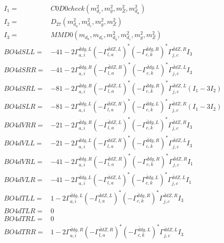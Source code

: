 \documentclass[A4,landscape]{article}
\begin{document}
\begin{align} 
I_1 = & C0D0check(m^2_{d_{{c}}}, m^2_{g}, m^2_{Z}, m^2_{d_{{a}}}) \\ 
I_2 = & D_{27}(m^2_{d_{{a}}}, m^2_{d_{{c}}}, m^2_{g}, m^2_{Z}) \\ 
I_3 = & MMD0(m_{d_{{a}}}, m_{d_{{c}}}, m^2_{d_{{a}}}, m^2_{d_{{c}}}, m^2_{g}, m^2_{Z}) \\ 
  BO4dSLL= & -4 1
-
2 \Gamma^{\bar{d}d g ,L}_{a, i} (- \Gamma^{\bar{d}d Z ,L} _{l, a})^* (- \Gamma^{\bar{d}d g ,R} _{c, k})^* \Gamma^{\bar{d}d Z ,R}_{j, c} I_3 \\ 
  BO4dSRR= & -4 1
-
2 \Gamma^{\bar{d}d g ,R}_{a, i} (- \Gamma^{\bar{d}d Z ,R} _{l, a})^* (- \Gamma^{\bar{d}d g ,L} _{c, k})^* \Gamma^{\bar{d}d Z ,L}_{j, c} I_3 \\ 
  BO4dSRL= & -8 1
-
2 \Gamma^{\bar{d}d g ,R}_{a, i} (- \Gamma^{\bar{d}d Z ,L} _{l, a})^* (- \Gamma^{\bar{d}d g ,R} _{c, k})^* \Gamma^{\bar{d}d Z ,L}_{j, c} (I_1 - 3 I_2) \\ 
  BO4dSLR= & -8 1
-
2 \Gamma^{\bar{d}d g ,L}_{a, i} (- \Gamma^{\bar{d}d Z ,R} _{l, a})^* (- \Gamma^{\bar{d}d g ,L} _{c, k})^* \Gamma^{\bar{d}d Z ,R}_{j, c} (I_1 - 3 I_2) \\ 
  BO4dVRR= & -2 1
-
2 \Gamma^{\bar{d}d g ,R}_{a, i} (- \Gamma^{\bar{d}d Z ,L} _{l, a})^* (- \Gamma^{\bar{d}d g ,L} _{c, k})^* \Gamma^{\bar{d}d Z ,R}_{j, c} I_3 \\ 
  BO4dVLL= & -2 1
-
2 \Gamma^{\bar{d}d g ,L}_{a, i} (- \Gamma^{\bar{d}d Z ,R} _{l, a})^* (- \Gamma^{\bar{d}d g ,R} _{c, k})^* \Gamma^{\bar{d}d Z ,L}_{j, c} I_3 \\ 
  BO4dVRL= & -4 1
-
2 \Gamma^{\bar{d}d g ,R}_{a, i} (- \Gamma^{\bar{d}d Z ,R} _{l, a})^* (- \Gamma^{\bar{d}d g ,R} _{c, k})^* \Gamma^{\bar{d}d Z ,R}_{j, c} I_1 \\ 
  BO4dVLR= & -4 1
-
2 \Gamma^{\bar{d}d g ,L}_{a, i} (- \Gamma^{\bar{d}d Z ,L} _{l, a})^* (- \Gamma^{\bar{d}d g ,L} _{c, k})^* \Gamma^{\bar{d}d Z ,L}_{j, c} I_1 \\ 
  BO4dTLL= & 1
-
2 \Gamma^{\bar{d}d g ,L}_{a, i} (- \Gamma^{\bar{d}d Z ,L} _{l, a})^* (- \Gamma^{\bar{d}d g ,R} _{c, k})^* \Gamma^{\bar{d}d Z ,R}_{j, c} I_3 \\ 
  BO4dTLR= & 0 \\ 
  BO4dTRL= & 0 \\ 
  BO4dTRR= & 1
-
2 \Gamma^{\bar{d}d g ,R}_{a, i} (- \Gamma^{\bar{d}d Z ,R} _{l, a})^* (- \Gamma^{\bar{d}d g ,L} _{c, k})^* \Gamma^{\bar{d}d Z ,L}_{j, c} I_3 \\ 
\end{align} 
\end{document}
